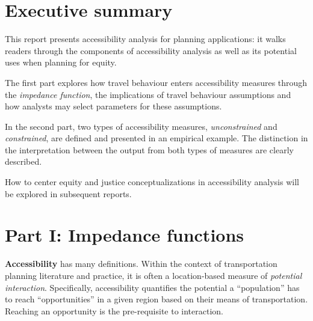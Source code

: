 \documentclass[12pt, oneside]{report}
\begin{document}



\setcounter{tocdepth}{1}
\tableofcontents
\restoregeometry

\newpage\ifdefined\Shaded\renewenvironment{Shaded}{\begin{tcolorbox}[boxrule=0pt, interior hidden, sharp corners, borderline west={3pt}{0pt}{shadecolor}, frame hidden, breakable, enhanced]}{\end{tcolorbox}}\fi

\hypertarget{executive-summary}{%
\section{Executive summary}\label{executive-summary}}

This report presents accessibility analysis for planning applications:
it walks readers through the components of accessibility analysis as
well as its potential uses when planning for equity.

The first part explores how travel behaviour enters accessibility
measures through the \emph{impedance function}, the implications of
travel behaviour assumptions and how analysts may select parameters for
these assumptions.

In the second part, two types of accessibility measures,
\emph{unconstrained} and \emph{constrained}, are defined and presented
in an empirical example. The distinction in the interpretation between
the output from both types of measures are clearly described.

How to center equity and justice conceptualizations in accessibility
analysis will be explored in subsequent reports.

\newpage

\hypertarget{sec-partI}{%
\section{Part I: Impedance functions}\label{sec-partI}}

\textbf{Accessibility} has many definitions. Within the context of
transportation planning literature and practice, it is often a
location-based measure of \emph{potential interaction}. Specifically,
accessibility quantifies the potential a ``population'' has to reach
``opportunities'' in a given region based on their means of
transportation. Reaching an opportunity is the pre-requisite to
interaction.
\end{document}
